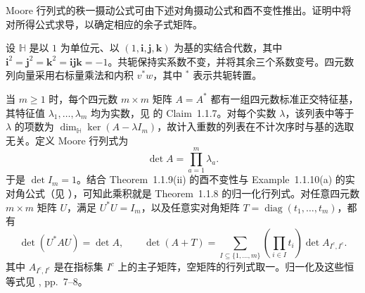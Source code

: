 Moore 行列式的秩一摄动公式可由下述对角摄动公式和酉不变性推出。证明中将对所得公式求导，以确定相应的余子式矩阵。

\begin{Proposition}\label{ext:alesker-determinant}
设 $\mathbb H$ 是以 $1$ 为单位元、以 $(1,\mathbf i,\mathbf j,\mathbf k)$ 为基的实结合代数，其中 $\mathbf i^2=\mathbf j^2=\mathbf k^2=\mathbf i\mathbf j\mathbf k=-1$。共轭保持实系数不变，并将其余三个系数变号。四元数列向量采用右标量乘法和内积 $v^*w$，其中 $^*$ 表示共轭转置。

当 $m\ge1$ 时，每个四元数 $m\times m$ 矩阵 $A=A^*$ 都有一组四元数标准正交特征基，其特征值 $\lambda_1,\ldots,\lambda_m$ 均为实数，见 \cite{r-2} 的 Claim~1.1.7。对每个实数 $\lambda$，该列表中等于 $\lambda$ 的项数为 $\dim_{\mathbb H}\ker(A-\lambda I_m)$，故计入重数的列表在不计次序时与基的选取无关。定义 Moore 行列式为
\[
 \det A=\prod_{a=1}^m\lambda_a.
\]
于是 $\det I_m=1$。结合 Theorem~1.1.9(ii) 的酉不变性与 Example~1.1.10(a) 的实对角公式（见 \cite{r-2}），可知此乘积就是 Theorem~1.1.8 的归一化行列式。对任意四元数 $m\times m$ 矩阵 $U$，满足 $U^*U=I_m$，以及任意实对角矩阵 $T=\operatorname{diag}(t_1,\ldots,t_m)$，都有
\[
 \det(U^*AU)=\det A,\qquad
 \det(A+T)=\sum_{I\subseteq\{1,\ldots,m\}}
          \left(\prod_{i\in I}t_i\right)\det A_{I^c,I^c}.
\]
其中 $A_{I^c,I^c}$ 是在指标集 $I^c$ 上的主子矩阵，空矩阵的行列式取一。归一化及这些恒等式见 \cite{r-2}, pp.~7--8。
\end{Proposition}
